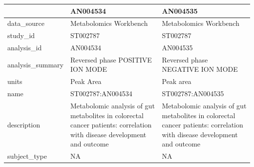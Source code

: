 \documentclass[
]{article}
\newenvironment{Shaded}{\begin{snugshade}}{\end{snugshade}}
\newcommand{\CommentTok}[1]{\textcolor[rgb]{0.56,0.35,0.01}{\textit{#1}}}
\newcommand{\ControlFlowTok}[1]{\textcolor[rgb]{0.13,0.29,0.53}{\textbf{#1}}}
\newcommand{\FunctionTok}[1]{\textcolor[rgb]{0.13,0.29,0.53}{\textbf{#1}}}
\newcommand{\NormalTok}[1]{#1}
\newcommand{\OtherTok}[1]{\textcolor[rgb]{0.56,0.35,0.01}{#1}}
\newcommand{\SpecialCharTok}[1]{\textcolor[rgb]{0.81,0.36,0.00}{\textbf{#1}}}
\begin{document}
\begin{Shaded}
\end{Shaded}

\begin{longtable}[t]{>{\raggedright\arraybackslash}p{3cm}>{\raggedright\arraybackslash}p{5.5cm}>{\raggedright\arraybackslash}p{5.5cm}}
\toprule
 & AN004534 & AN004535\\
\midrule
data\_source & Metabolomics Workbench & Metabolomics Workbench\\
study\_id & ST002787 & ST002787\\
analysis\_id & AN004534 & AN004535\\
analysis\_summary & Reversed phase POSITIVE ION MODE & Reversed phase NEGATIVE ION MODE\\
units & Peak Area & Peak area\\
\addlinespace
name & ST002787:AN004534 & ST002787:AN004535\\
description & Metabolomic analysis of gut metabolites in colorectal cancer patients: correlation with disease development and outcome & Metabolomic analysis of gut metabolites in colorectal cancer patients: correlation with disease development and outcome\\
subject\_type & NA & NA\\
\bottomrule
\end{longtable}
\end{document}
